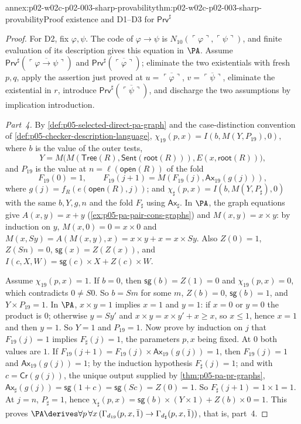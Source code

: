 \begin{annexitem}{annex:p02-w02c-p02-003-sharp-provability}{thm:p02-w02c-p02-003-sharp-provability}{Proof existence and D1--D3 for \(\mathsf{Prv}^{\sharp}\)}
\begin{proof}
For D2, fix \(\varphi,\psi\).  The code of \(\varphi\to\psi\) is
\(N_{10}(\ulcorner\varphi\urcorner,\ulcorner\psi\urcorner)\), and finite
evaluation of its description gives this equation in \(\PA\).  Assume
\(\mathsf{Prv}^{\sharp}(\overline{\ulcorner\varphi\to\psi\urcorner})\) and
\(\mathsf{Prv}^{\sharp}(\overline{\ulcorner\varphi\urcorner})\); eliminate
the two existentials with fresh \(p,q\), apply the assertion just proved at
\(u=\overline{\ulcorner\varphi\urcorner}\),
\(v=\overline{\ulcorner\psi\urcorner}\), eliminate the existential in
\(r\), introduce
\(\mathsf{Prv}^{\sharp}(\overline{\ulcorner\psi\urcorner})\), and discharge
the two assumptions by implication introduction.

\emph{Part~4.}  By \cref{def:p05-selected-direct-pa-graph} and the
case-distinction convention of \cref{def:p05-checker-description-language},
\(\chi_{19}(p,x)=I(b,M(Y,P_{19}),0)\), where \(b\) is the value of the outer
tests,
\[
 Y=M\bigl(M(\mathsf{Tree}(R),\mathsf{Sent}(\mathsf{root}(R))),
       E(x,\mathsf{root}(R))\bigr),
\]
and \(P_{19}\) is the value at \(n=\ell(\mathsf{open}(R))\) of the fold
\[
 F_{19}(0)=1,\qquad F_{19}(j+1)=M(F_{19}(j),\mathsf{Ax}_{19}(g(j))),
\]
where \(g(j)=f_R(e(\mathsf{open}(R),j))\);
and \(\chi_{\sharp}(p,x)=I(b,M(Y,P_{\sharp}),0)\) with the same
\(b,Y,g,n\) and the fold \(F_{\sharp}\) using \(\mathsf{Ax}_{\sharp}\).  In \(\PA\), the graph equations give
\(A(x,y)=x+y\) (\cref{ex:p05-pa-pair-cons-graphs}) and \(M(x,y)=x\times y\):
by induction on \(y\), \(M(x,0)=0=x\times0\) and
\(M(x,Sy)=A(M(x,y),x)=x\times y+x=x\times Sy\).  Also \(Z(0)=1\),
\(Z(Sn)=0\), \(\mathsf{sg}(x)=Z(Z(x))\), and
\(I(c,X,W)=\mathsf{sg}(c)\times X+Z(c)\times W\).

Assume \(\chi_{19}(p,x)=1\).  If \(b=0\), then \(\mathsf{sg}(b)=Z(1)=0\) and
\(\chi_{19}(p,x)=0\), which contradicts \(0\ne S0\).  So \(b=Sm\) for some
\(m\), \(Z(b)=0\), \(\mathsf{sg}(b)=1\), and \(Y\times P_{19}=1\).  In
\(\PA\), \(x\times y=1\) implies \(x=1\) and \(y=1\): if \(x=0\) or \(y=0\)
the product is \(0\); otherwise \(y=Sy'\) and \(x\times y=x\times y'+x\ge x\),
so \(x\le1\), hence \(x=1\) and then \(y=1\).  So \(Y=1\) and \(P_{19}=1\).
Now prove by induction on \(j\) that \(F_{19}(j)=1\) implies
\(F_{\sharp}(j)=1\), the parameters \(p,x\) being fixed.  At \(0\) both values
are \(1\).  If \(F_{19}(j+1)=F_{19}(j)\times\mathsf{Ax}_{19}(g(j))=1\), then
\(F_{19}(j)=1\) and \(\mathsf{Ax}_{19}(g(j))=1\); by the induction hypothesis
\(F_{\sharp}(j)=1\); and with \(c=\mathsf{Cr}(g(j))\), the unique output
supplied by \cref{thm:p05-pa-pr-graphs},
\(\mathsf{Ax}_{\sharp}(g(j))=\mathsf{sg}(1+c)=\mathsf{sg}(Sc)=Z(0)=1\).
So \(F_{\sharp}(j+1)=1\times1=1\).  At \(j=n\), \(P_{\sharp}=1\), hence
\(\chi_{\sharp}(p,x)=\mathsf{sg}(b)\times(Y\times1)+Z(b)\times0=1\).  This
proves \(\PA\derives\forall p\,\forall x\,(\Gamma_{d_{19}}(p,x,\bar1)\to
\Gamma_{d_{\sharp}}(p,x,\bar1))\), that is, part~4.


\end{proof}
\end{annexitem}

